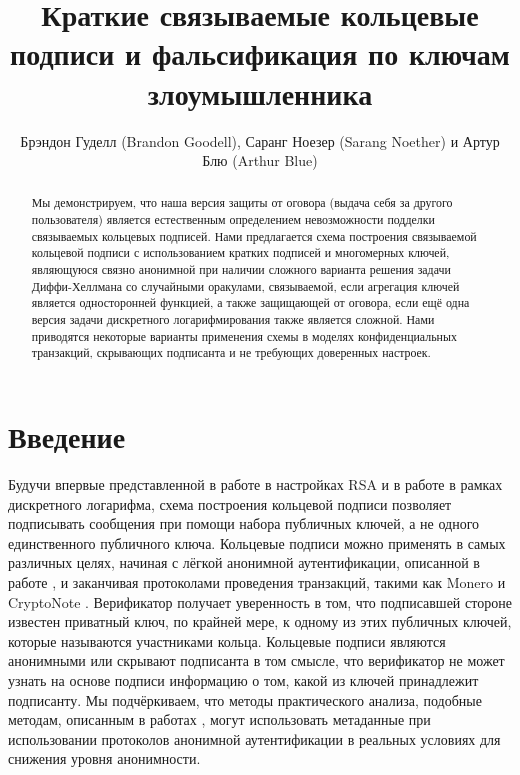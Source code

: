 \documentclass{llncs}
\title{Краткие связываемые кольцевые подписи и фальсификация по ключам злоумышленника}
\institute{Исследовательская лаборатория Monero (Monero Research Lab), \email{\{surae,sarang\}@getmonero.org} \and Независимый исследователь, \email{randomrun@protonmail.com}}
\author{Брэндон Гуделл (Brandon Goodell)\inst{1}, Саранг Ноезер (Sarang Noether)\inst{1} и Артур Блю (Arthur Blue)\inst{2}}
\begin{document}
\maketitle

\begin{abstract}
Мы демонстрируем, что наша версия защиты от оговора (выдача себя за другого пользователя) является естественным определением невозможности подделки связываемых кольцевых подписей. Нами предлагается схема построения связываемой кольцевой подписи с использованием кратких подписей и многомерных ключей, являющуюся связно анонимной при наличии сложного варианта решения задачи Диффи-Хеллмана со случайными оракулами, связываемой, если агрегация ключей является односторонней функцией, а также защищающей от оговора, если ещё одна версия задачи дискретного логарифмирования также является сложной. Нами приводятся некоторые варианты применения схемы в моделях конфиденциальных транзакций, скрывающих подписанта и не требующих доверенных настроек.
\end{abstract}


\section{Введение}

Будучи впервые представленной в работе \cite{rivest} в настройках RSA и в работе \cite{liu2004linkable} в рамках дискретного логарифма, схема построения кольцевой подписи позволяет подписывать сообщения при помощи набора публичных ключей, а не одного единственного публичного ключа. Кольцевые подписи можно применять в самых различных целях, начиная с лёгкой анонимной аутентификации, описанной в работе \cite{yang2015lightweight}, и заканчивая протоколами проведения транзакций, такими как Monero \cite{noether2016ring} и CryptoNote \cite{van2013cryptonote}. Верификатор получает уверенность в том, что подписавшей стороне известен приватный ключ, по крайней мере, к одному из этих публичных ключей, которые называются участниками кольца. Кольцевые подписи являются анонимными или скрывают подписанта в том смысле, что верификатор не может узнать на основе подписи информацию о том, какой из ключей принадлежит подписанту. Мы подчёркиваем, что методы практического анализа, подобные методам, описанным в работах \cite{moser2018empirical,quesnelle2017linkability}, могут использовать метаданные при использовании протоколов анонимной аутентификации в реальных условиях для снижения уровня анонимности.
\end{document}
